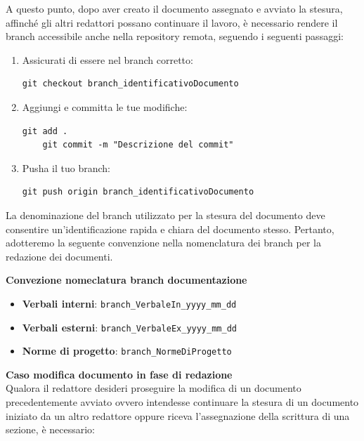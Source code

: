 \documentclass{article}
\begin{document}
\begin{enumerate}
    A questo punto, dopo aver creato il documento assegnato e avviato la stesura, affinché gli altri redattori possano continuare il lavoro, è necessario rendere il branch accessibile anche nella repository remota, seguendo i seguenti passaggi:

    \begin{enumerate}
        \item Assicurati di essere nel branch corretto:
        \begin{lstlisting}[style=code]
    git checkout branch_identificativoDocumento 
        \end{lstlisting}

        \item Aggiungi e committa le tue modifiche:
        \begin{lstlisting}[style=code]
    git add .
    git commit -m "Descrizione del commit"
        \end{lstlisting}
        
        \item Pusha il tuo branch:
        \begin{lstlisting}[style=code]
    git push origin branch_identificativoDocumento
        \end{lstlisting}
    \end{enumerate}

    La denominazione del branch utilizzato per la stesura del documento deve consentire un'identificazione rapida e chiara del documento stesso. Pertanto, adotteremo la seguente convenzione nella nomenclatura dei branch per la redazione dei documenti.

    \vspace{0.3cm}
    \textbf{Convezione nomeclatura branch documentazione}
    \begin{itemize}
        \item \textbf{Verbali interni}: \verb|branch_VerbaleIn_yyyy_mm_dd|
        \item \textbf{Verbali esterni}: \verb|branch_VerbaleEx_yyyy_mm_dd|
        \item \textbf{Norme di progetto}: \verb|branch_NormeDiProgetto|
    \end{itemize}

    \textbf{Caso modifica documento in fase di redazione}\\
   Qualora il redattore desideri proseguire la modifica di un documento precedentemente avviato ovvero intendesse continuare la stesura di un documento iniziato da un altro redattore oppure riceva l'assegnazione della scrittura di una sezione, è necessario:
    

\end{enumerate}
\end{document}
